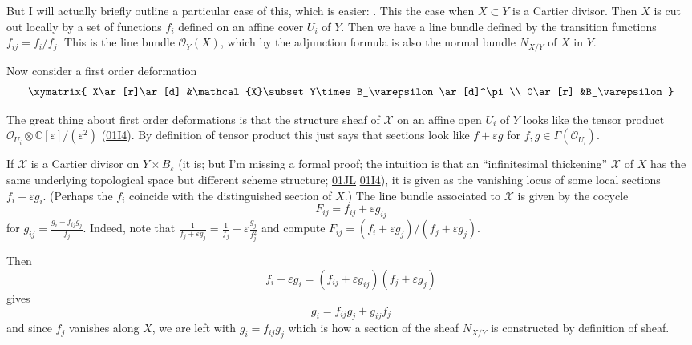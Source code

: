 \documentclass{book}
\begin{document}
But I will actually briefly outline a
particular case
of this, which is easier: \cite[Examples
3.2.4(ii)]{Sernesi-deformations}.
This the case when $X \subset Y$ is a Cartier
divisor.
Then $X$ is cut out locally by a set of
functions $f_i$
defined on an affine cover $U_i$ of $Y$.
Then we have a line bundle defined by the
transition functions $f_{ij}=f_i/f_j$.
This is the line bundle $\mathcal{O}_Y(X)$,
which
by the adjunction formula is also the normal
bundle $N_{X/Y}$
of $X$ in $Y$.

Now consider a first order deformation
$$
\xymatrix{
X\ar[r]\ar[d]
&\mathcal{X}\subset Y\times
B_\varepsilon\ar[d]^\pi\\
0\ar[r]
&B_\varepsilon
}
$$

The great thing about first order
deformations
is that the structure sheaf of $\mathcal{X}$
on an affine open $U_i$ of $Y$
looks like the tensor product
$\mathcal{O}_{U_i}\otimes
\mathbb{C}[\varepsilon]/(\varepsilon^2)$
(\href{https://stacks.math.columbia.edu/tag/%
01I4}{01I4}).
By definition of tensor product this just
says
that sections look like $f+\varepsilon g$
for $f,g \in \Gamma(\mathcal{O}_{U_i})$.

If $\mathcal{X}$ is a Cartier divisor on $Y
\times B_\varepsilon$
(it is; but I'm missing a formal proof;
the intuition is that an ``infinitesimal
thickening'' $\mathcal{X}$
of $X$ has the same underlying topological
space
but different scheme structure;
\href{https://stacks.math.columbia.edu/tag/%
01JL}{01JL}
\href{https://stacks.math.columbia.edu/tag/%
01I4}{01I4}),
it is given as the vanishing locus
of some local sections $f_i+\varepsilon g_i$.
(Perhaps the $f_i$ coincide with the
distinguished
section of $X$.)
The line bundle associated to $\mathcal{X}$
is given by the cocycle
$$
F_{ij}=f_{ij}+\varepsilon g_{ij}
$$
for $g_{ij}=\frac{g_i-f_{ij}g_j}{f_j}$.
Indeed, note that
$\frac{1}{f_j+\varepsilon
g_j}=\frac{1}{f_j}-\varepsilon
\frac{g_j}{f^2_j}$
and compute $F_{ij}=(f_i+\varepsilon
g_j)/(f_j+\varepsilon g_j)$.

Then
$$
f_i+\varepsilon g_i=(f_{ij}+\varepsilon
g_{ij})(f_j+\varepsilon g_j)
$$
gives
$$
g_i=f_{ij}g_j+g_{ij}f_j
$$
and since $f_j$ vanishes along $X$,
we are left with $g_i=f_{ij}g_j$
which is how a section of the sheaf $N_{X/Y}$
is constructed by definition of sheaf.
\end{document}
